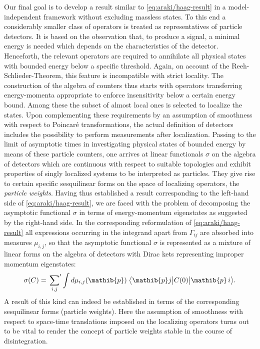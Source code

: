\documentclass[a4paper,a4paper]{article}
\numberwithin{equation}{section}
\newcommand{\pib}{\mathib{p}}
\theoremstyle{definition}
\theoremstyle{plain}
\theoremstyle{remark}
\newcommand{\bscpx}[3]{\bigl\langle #1 \big\vert #2 \big\vert #3
  \bigr\rangle}
\begin{document}
  Our final goal is to develop a result similar to
  \eqref{eq:araki/haag-result} in a model-independent framework
  without excluding massless states. To this end a considerably
  smaller class of operators is treated as representatives of particle
  detectors. It is based on the observation that, to produce a signal,
  a minimal energy is needed which depends on the characteristics of
  the detector. Henceforth, the relevant operators are required to
  annihilate all physical states with bounded energy below a specific
  threshold.  Again, on account of the Reeh-Schlieder-Theorem, this
  feature is incompatible with strict locality. The construction of
  the algebra of counters thus starts with operators transferring
  energy-momenta appropriate to enforce insensitivity below a certain
  energy bound. Among these the subset of almost local ones is
  selected to localize the states. Upon complementing these
  requirements by an assumption of smoothness with respect to
  Poincar\'e transformations, the actual definition of detectors
  includes the possibility to perform measurements after localization.
  Passing to the limit of asymptotic times in investigating physical
  states of bounded energy by means of these particle counters, one
  arrives at linear functionals $\sigma$ on the algebra of detectors
  which are continuous with respect to suitable topologies and exhibit
  properties of singly localized systems to be interpreted as
  particles. They give rise to certain specific sesquilinear forms on
  the space of localizing operators, the \emph{particle weights}.
  Having thus established a result corresponding to the left-hand side
  of \eqref{eq:araki/haag-result}, we are faced with the problem of
  decomposing the asymptotic functional $\sigma$ in terms of
  energy-momentum eigenstates as suggested by the right-hand side. In
  the corresponding reformulation of \eqref{eq:araki/haag-result} all
  expressions occurring in the integrand apart from $\Gamma_{i j}$ are
  absorbed into measures $\mu_{i , j}$, so that the asymptotic
  functional $\sigma$ is represented as a mixture of linear forms on
  the algebra of detectors with Dirac kets representing improper
  momentum eigenstates:
  \begin{equation}
    \label{eq:araki/haag-reformulated}
    \sigma ( C ) = \sideset{}{'} \sum_{i , j} \int d \mu_{i , j} (
    \pib ) \; \bscpx{\pib j}{C ( 0 )}{\pib \, i} \text{.}
  \end{equation}
  A result of this kind can indeed be established in terms of
  the corresponding sesquilinear forms (particle weights). Here the
  assumption of smoothness with respect to space-time translations
  imposed on the localizing operators turns out to be vital to render
  the concept of particle weights stable in the course of
  disintegration.
  
\end{document}
